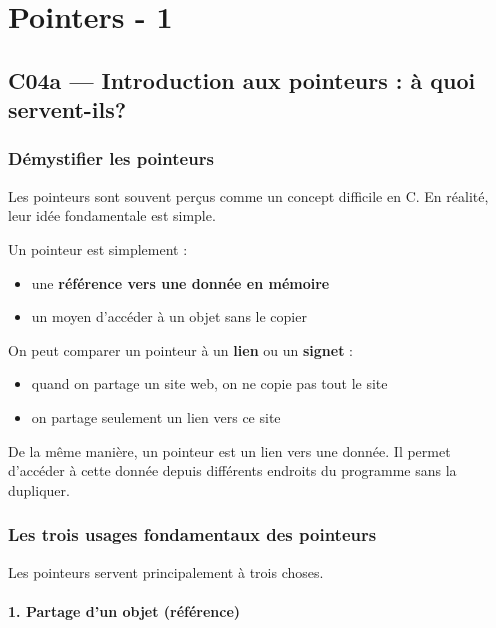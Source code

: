 
\chapter{Pointers - 1}%
\label{cha:Pointers - 1}

\section{C04a — Introduction aux pointeurs : à quoi servent-ils?}

\subsection{Démystifier les pointeurs}

Les pointeurs sont souvent perçus comme un concept difficile en C.
En réalité, leur idée fondamentale est simple.

Un pointeur est simplement :

\begin{itemize}
    \item une \textbf{référence vers une donnée en mémoire}
    \item un moyen d’accéder à un objet sans le copier
\end{itemize}

On peut comparer un pointeur à un \textbf{lien} ou un \textbf{signet} :

\begin{itemize}
    \item quand on partage un site web, on ne copie pas tout le site
    \item on partage seulement un lien vers ce site
\end{itemize}

De la même manière, un pointeur est un lien vers une donnée.
Il permet d’accéder à cette donnée depuis différents endroits du programme
sans la dupliquer.

\subsection{Les trois usages fondamentaux des pointeurs}

Les pointeurs servent principalement à trois choses.

\subsubsection{1. Partage d’un objet (référence)}

